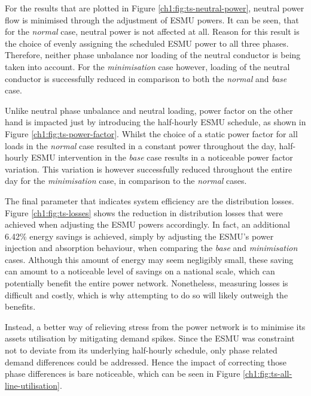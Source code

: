 For the results that are plotted in Figure \ref{ch1:fig:ts-neutral-power}, neutral power flow is minimised through the adjustment of ESMU powers.
It can be seen, that for the \textit{normal} case, neutral power is not affected at all.
Reason for this result is the choice of evenly assigning the scheduled ESMU power to all three phases.
Therefore, neither phase unbalance nor loading of the neutral conductor is being taken into account.
For the \textit{minimisation} case however, loading of the neutral conductor is successfully reduced in comparison to both the \textit{normal} and \textit{base} case.



Unlike neutral phase unbalance and neutral loading, power factor on the other hand is impacted just by introducing the half-hourly ESMU schedule, as shown in Figure \ref{ch1:fig:ts-power-factor}.
Whilst the choice of a static power factor for all loads in the \textit{normal} case resulted in a constant power throughout the day, half-hourly ESMU intervention in the \textit{base} case results in a noticeable power factor variation.
This variation is however successfully reduced throughout the entire day for the \textit{minimisation} case, in comparison to the \textit{normal} cases.



The final parameter that indicates system efficiency are the distribution losses.
Figure \ref{ch1:fig:ts-losses} shows the reduction in distribution losses that were achieved when adjusting the ESMU powers accordingly.
In fact, an additional 6.42\% energy savings is achieved, simply by adjusting the ESMU's power injection and absorption behaviour, when comparing the \textit{base} and \textit{minimisation} cases.
Although this amount of energy may seem negligibly small, these saving can amount to a noticeable level of savings on a national scale, which can potentially benefit the entire power network.
Nonetheless, measuring losses is difficult and costly, which is why attempting to do so will likely outweigh the benefits.

Instead, a better way of relieving stress from the power network is to minimise its assets utilisation by mitigating demand spikes.
Since the ESMU was constraint not to deviate from its underlying half-hourly schedule, only phase related demand differences could be addressed.
Hence the impact of correcting those phase differences is bare noticeable, which can be seen in Figure \ref{ch1:fig:ts-all-line-utilisation}.

